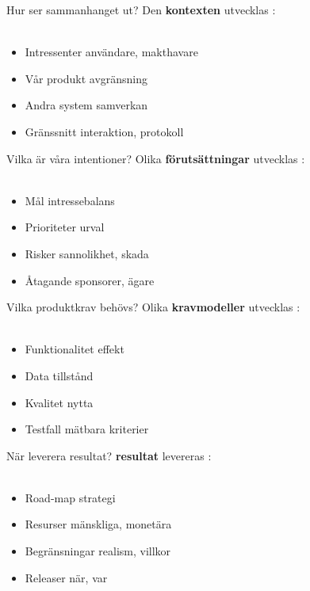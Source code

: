 \documentclass{simpleslides}
\begin{document}
\begin{Slide}{Hur ser sammanhanget ut?}
Den  \textbf{kontexten} utvecklas : \\~
\begin{itemize}
\item Intressenter \hfill användare, makthavare
\item Vår produkt  \hfill avgränsning
\item Andra system \hfill samverkan
\item Gränssnitt \hfill interaktion, protokoll
\end{itemize}
\end{Slide}


\begin{Slide}{Vilka är våra intentioner?}
Olika  \textbf{förutsättningar} utvecklas : \\~
\begin{itemize}
\item Mål \hfill intressebalans
\item Prioriteter  \hfill urval
\item Risker \hfill sannolikhet, skada
\item Åtagande \hfill sponsorer, ägare
\end{itemize}
\end{Slide}

\begin{Slide}{Vilka produktkrav behövs?}
Olika  \textbf{kravmodeller} utvecklas : \\~
\begin{itemize}
\item Funktionalitet \hfill effekt
\item Data  \hfill tillstånd
\item Kvalitet \hfill nytta
\item Testfall \hfill mätbara kriterier
\end{itemize}
\end{Slide}


\begin{Slide}{När leverera resultat?}
 \textbf{resultat} levereras : \\~
\begin{itemize}
\item Road-map \hfill strategi
\item Resurser  \hfill mänskliga, monetära
\item Begränsningar \hfill realism, villkor
\item Releaser \hfill när, var
\end{itemize}
\end{Slide}
\end{document}

